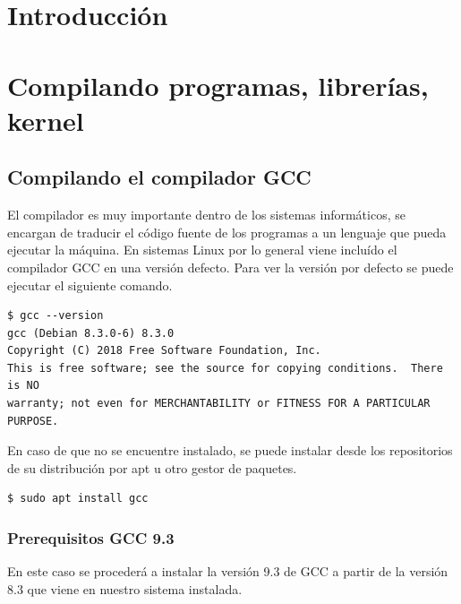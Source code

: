 \documentclass[12pt]{article}
\begin{document}
\newpage
\pagestyle{plain}
\tableofcontents

\newpage
\listoffigures 


\newpage
\section{Introducción}


\newpage
\section{Compilando programas, librerías, kernel}

\subsection{Compilando el compilador GCC}

El compilador es muy importante dentro de los sistemas informáticos, se encargan de traducir el código fuente de los programas a un lenguaje que pueda ejecutar la máquina. En sistemas Linux por lo general viene incluído el compilador GCC en una versión defecto. Para ver la versión por defecto se puede ejecutar el siguiente comando.

\begin{lstlisting}[frame=single,framexrightmargin=15pt]
$ gcc --version
gcc (Debian 8.3.0-6) 8.3.0
Copyright (C) 2018 Free Software Foundation, Inc.
This is free software; see the source for copying conditions.  There is NO
warranty; not even for MERCHANTABILITY or FITNESS FOR A PARTICULAR PURPOSE.
\end{lstlisting}

En caso de que no se encuentre instalado, se puede instalar desde los repositorios de su distribución por apt u otro gestor de paquetes.

\begin{lstlisting}[frame=single,framexrightmargin=15pt]
$ sudo apt install gcc
\end{lstlisting}

\subsubsection{Prerequisitos GCC 9.3}

En este caso se procederá a instalar la versión 9.3 de GCC a partir de la versión 8.3 que viene en nuestro sistema instalada.
\end{document}
